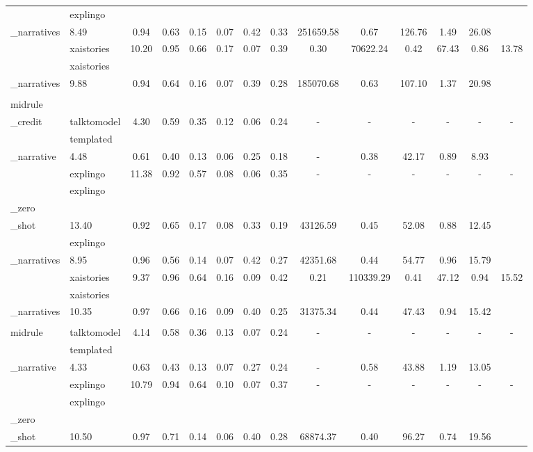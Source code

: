 {\begin{tabular}{llcccccccccccc}
     & explingo\\_narratives & 8.49 & 0.94 & 0.63 & 0.15 & 0.07 & 0.42 & 0.33 & 251659.58 & 0.67 & 126.76 & 1.49 & 26.08\\
     & xaistories & 10.20 & 0.95 & 0.66 & 0.17 & 0.07 & 0.39 & 0.30 & 70622.24 & 0.42 & 67.43 & 0.86 & 13.78\\
     & xaistories\\_narratives & 9.88 & 0.94 & 0.64 & 0.16 & 0.07 & 0.39 & 0.28 & 185070.68 & 0.63 & 107.10 & 1.37 & 20.98\\
    \\midrule
    \multirow{7}{*}{German\\_credit} & talktomodel & 4.30 & 0.59 & 0.35 & 0.12 & 0.06 & 0.24 & - & - & - & - & - & -\\
     & templated\\_narrative & 4.48 & 0.61 & 0.40 & 0.13 & 0.06 & 0.25 & 0.18 & - & 0.38 & 42.17 & 0.89 & 8.93\\
     & explingo & 11.38 & 0.92 & 0.57 & 0.08 & 0.06 & 0.35 & - & - & - & - & - & -\\
     & explingo\\_zero\\_shot & 13.40 & 0.92 & 0.65 & 0.17 & 0.08 & 0.33 & 0.19 & 43126.59 & 0.45 & 52.08 & 0.88 & 12.45\\
     & explingo\\_narratives & 8.95 & 0.96 & 0.56 & 0.14 & 0.07 & 0.42 & 0.27 & 42351.68 & 0.44 & 54.77 & 0.96 & 15.79\\
     & xaistories & 9.37 & 0.96 & 0.64 & 0.16 & 0.09 & 0.42 & 0.21 & 110339.29 & 0.41 & 47.12 & 0.94 & 15.52\\
     & xaistories\\_narratives & 10.35 & 0.97 & 0.66 & 0.16 & 0.09 & 0.40 & 0.25 & 31375.34 & 0.44 & 47.43 & 0.94 & 15.42\\
    \\midrule
    \multirow{7}{*}{Stroke} & talktomodel & 4.14 & 0.58 & 0.36 & 0.13 & 0.07 & 0.24 & - & - & - & - & - & -\\
     & templated\\_narrative & 4.33 & 0.63 & 0.43 & 0.13 & 0.07 & 0.27 & 0.24 & - & 0.58 & 43.88 & 1.19 & 13.05\\
     & explingo & 10.79 & 0.94 & 0.64 & 0.10 & 0.07 & 0.37 & - & - & - & - & - & -\\
     & explingo\\_zero\\_shot & 10.50 & 0.97 & 0.71 & 0.14 & 0.06 & 0.40 & 0.28 & 68874.37 & 0.40 & 96.27 & 0.74 & 19.56\\

\end{tabular}}
